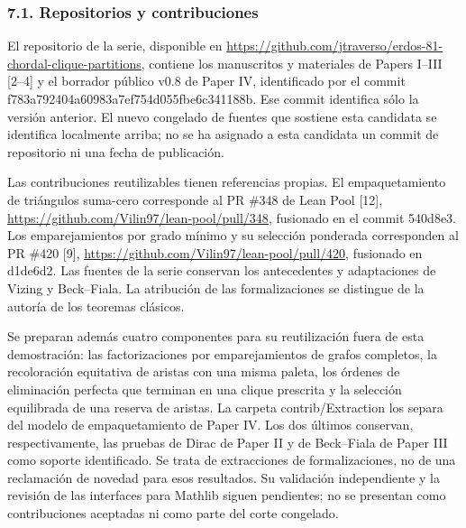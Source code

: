 \documentclass[spanish,11pt,a4paper]{article}
\begin{document}
\subsubsection{7.1. Repositorios y contribuciones}\label{repositorios-y-contribuciones}

El repositorio de la serie, disponible en \url{https://github.com/jtraverso/erdos-81-chordal-clique-partitions}, contiene los manuscritos y materiales de Papers I--III {[}2--4{]} y el borrador público v0.8 de Paper IV, identificado por el commit {\ttfamily\small f783a792404a\discretionary{\hbox{\ensuremath{\hookrightarrow}}}{}{}60983a7ef754\discretionary{\hbox{\ensuremath{\hookrightarrow}}}{}{}d055fbe6c341\discretionary{\hbox{\ensuremath{\hookrightarrow}}}{}{}188b}. Ese commit identifica sólo la versión anterior. El nuevo congelado de fuentes que sostiene esta candidata se identifica localmente arriba; no se ha asignado a esta candidata un commit de repositorio ni una fecha de publicación.

Las contribuciones reutilizables tienen referencias propias. El empaquetamiento de triángulos suma-cero corresponde al PR \#348 de Lean Pool {[}12{]}, \url{https://github.com/Vilin97/lean-pool/pull/348}, fusionado en el commit {\ttfamily\small 540d8e3}. Los emparejamientos por grado mínimo y su selección ponderada corresponden al PR \#420 {[}9{]}, \url{https://github.com/Vilin97/lean-pool/pull/420}, fusionado en {\ttfamily\small d1de6d2}. Las fuentes de la serie conservan los antecedentes y adaptaciones de Vizing y Beck--Fiala. La atribución de las formalizaciones se distingue de la autoría de los teoremas clásicos.

Se preparan además cuatro componentes para su reutilización fuera de esta demostración: las factorizaciones por emparejamientos de grafos completos, la recoloración equitativa de aristas con una misma paleta, los órdenes de eliminación perfecta que terminan en una clique prescrita y la selección equilibrada de una reserva de aristas. La carpeta {\ttfamily\small contrib/\discretionary{\hbox{\ensuremath{\hookrightarrow}}}{}{}Extraction} los separa del modelo de empaquetamiento de Paper IV. Los dos últimos conservan, respectivamente, las pruebas de Dirac de Paper II y de Beck--Fiala de Paper III como soporte identificado. Se trata de extracciones de formalizaciones, no de una reclamación de novedad para esos resultados. Su validación independiente y la revisión de las interfaces para Mathlib siguen pendientes; no se presentan como contribuciones aceptadas ni como parte del corte congelado.
\end{document}
